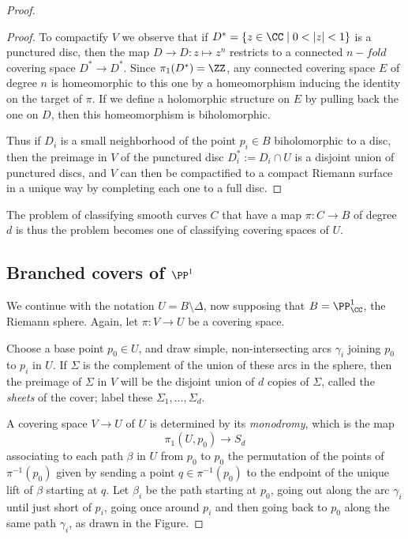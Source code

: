 \begin{proof}
\begin{proof}
To compactify $V$ we observe that if $D^* = \{ z \in \CC \mid 0 < |z| < 1 \}$ is a punctured disc, then
the map $D\to D: z \mapsto z^n$ restricts to a connected $n-fold$ covering space $D^*\to D^*$. 
Since $\pi_1(D^*) = \ZZ$, any connected covering space $E$ of degree $n$ is homeomorphic to this one
by a homeomorphism inducing the identity on the target of $\pi$.
If we  define a holomorphic structure on $E$ by pulling back the one on $D$, then
this homeomorphism is biholomorphic.

Thus if $D_i$ is a small neighborhood of the point $p_i \in B$ biholomorphic to a disc, then the preimage  in $V$ of the punctured disc $D_i^* := D_i \cap U$ is a disjoint union of punctured discs, and $V$ can then be compactified to a compact Riemann surface in a unique way by completing each one to a full disc.
\end{proof}
   
 The problem of classifying smooth curves $C$ that have a map $\pi : C \to B$ of degree $d$ is thus the problem becomes one of classifying covering spaces of $U$. 
    
 \subsection{Branched covers of $\PP^1$} 

We continue with the notation $U = B\setminus \Delta$, now supposing that $B = \PP^1_\CC$, the Riemann sphere. Again, let $\pi:V\to U$ be a covering space.

Choose a base point $p_0 \in U$, and draw simple, non-intersecting arcs $\gamma_i$ joining $p_0$ to $p_i$ in $U$. If $\Sigma$ is the complement of the union of these arcs in the sphere, then the preimage of $\Sigma$ in $V$ will be the disjoint union of $d$ copies of $\Sigma$, called the \emph{sheets} of the cover; label these $\Sigma_1,\dots,\Sigma_d$.

   
A covering space $V \to U$ of $U$ is determined by its \emph{monodromy}, which is the map
   $$
   \pi_1(U, p_0) \to S_d
   $$
associating to each path  $\beta$ in $U$ from $p_0$ to $p_0$  the permutation of the points of $\pi^{-1}(p_0)$ given by sending a point $q \in \pi^{-1}(p_0)$ to the endpoint of the unique lift of $\beta$ starting at $q$. Let $\beta_i$ be the path starting at $p_0$, going out along the arc $\gamma_i$ until just short of $p_i$, going once around $p_i$ and then going back to $p_0$ along the same path $\gamma_i$, as drawn in the Figure. 


\end{proof}
